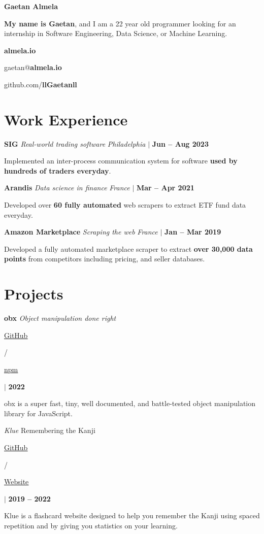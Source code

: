 \documentclass[12pt]{article}
\newcommand{\bigtitle}[5]{
  {\bf \large #1} \textemdash{} {\large \it #2} \hfill {#3}

  {\small #4}

  \smallskip

  #5 %

  \medskip
}
\newcommand{\link}[2]{
   \underline{{\href{#1}{#2}}}
}
\begin{document}
    {\fontsize{40}{50} \selectfont \bf \intertabular Gaetan Almela}

    \smallskip

    {\bf My name is Gaetan}, and I am a 22 year old programmer looking for an
    internship in Software Engineering, Data Science, or Machine Learning.

    \begin{center}
      \begin{multicols}{3}
       {\bf almela.io}

       gaetan@{\bf almela.io}

       github.com/{\bf llGaetanll}
      \end{multicols}
    \end{center}

    \section{Work Experience}

    \bigtitle{SIG}{Real-world trading software}
    {
      \textit{Philadelphia} $\Big|$ \textbf{Jun -- Aug 2023}
    }
    {}
    {
      Implemented an inter-process communication system for software {\bf used
      by hundreds of traders everyday}.
    }

    \bigtitle{Arandis}{Data science in finance}
    {
      \textit{France} $\Big|$ \textbf{Mar -- Apr 2021}
    }
    {}
    {
       Developed over {\bf 60 fully automated} web scrapers to extract ETF fund data everyday.
    }

    \bigtitle{Amazon Marketplace}{Scraping the web}
    {
      \textit{France} $\Big|$ \textbf{Jan -- Mar 2019}
    }
    {}
    {
       Developed a fully automated marketplace scraper to extract {\bf over 30,000
       data points} from competitors including pricing, and seller databases.
    }

    \section{Projects}

    \bigtitle{obx}{Object manipulation done right}
    {
      \link{https://github.com/llGaetanll/obx/}{GitHub}
      /
      \link{https://www.npmjs.com/package/@almela/obx}{npm}
      $\Big|$
      \textbf{2022}
    }
    {
       obx is a super fast, tiny, well documented, and battle-tested object
       manipulation library for JavaScript.
    }

    \bigtitle{Klue}{Remembering the Kanji}
    {
      \link{https://github.com/llGaetanll/Klue}{GitHub}
      /
      \link{https://klue.vercel.app/}{Website}
      $\Big|$
      \textbf{2019 -- 2022}
    }
    {
       Klue is a flashcard website designed to help you remember the Kanji
       using spaced repetition and by giving you statistics on your learning.
    }
\end{document}
